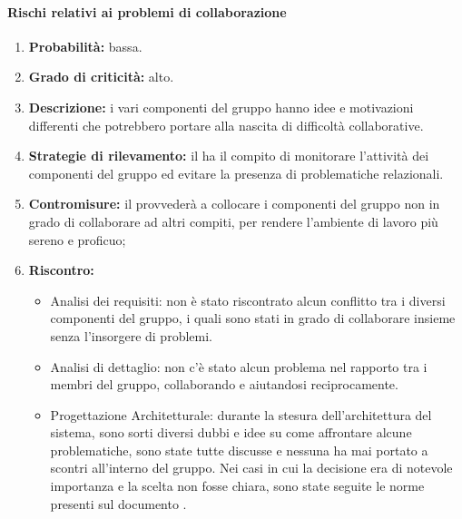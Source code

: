 \paragraph{Rischi relativi ai problemi di collaborazione}\mbox{}
\begin{enumerate}
	\item \textbf{Probabilità:} bassa.
	\item \textbf{Grado di criticità:} alto.
	\item \textbf{Descrizione:} i vari componenti del gruppo hanno idee e motivazioni differenti che potrebbero portare alla nascita di difficoltà collaborative.
	\item \textbf{Strategie di rilevamento:} il \Responsabile{} ha il compito di monitorare l’attività dei componenti del gruppo ed evitare la presenza di problematiche relazionali.
	\item \textbf{Contromisure:} il \Responsabile{} provvederà a collocare i componenti del gruppo non in grado di collaborare ad altri compiti, per rendere l’ambiente di lavoro più sereno e proficuo;
	\item \textbf{Riscontro:}
	\begin{itemize}
		\item Analisi dei requisiti: non è stato riscontrato alcun conflitto tra i diversi componenti del gruppo, i quali sono stati in grado di collaborare insieme senza l'insorgere di problemi.
		\item Analisi di dettaglio: non c'è stato alcun problema nel rapporto tra i membri del gruppo, collaborando e aiutandosi reciprocamente.
		\item Progettazione Architetturale: durante la stesura dell'architettura del sistema, sono sorti diversi dubbi e idee su come affrontare alcune problematiche, sono state tutte discusse e nessuna ha mai portato a scontri all’interno del gruppo. Nei casi in cui la decisione era di notevole importanza e la scelta non fosse chiara, sono state seguite le norme presenti sul documento \NormeDiProgetto{}.
	\end{itemize}
\end{enumerate}

